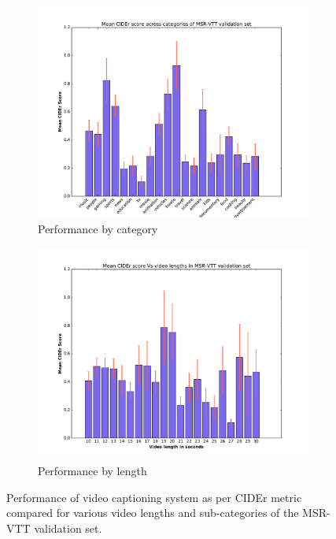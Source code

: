 \begin{figure}[ht]
\begin{center}
  \begin{adjustbox}{center}
  \begin{subfigure}[c]{0.65\linewidth}
    \centering
    \includegraphics[width=1.0\linewidth]{images/VTTCiderCateg.pdf}%
    \caption{Performance by category}%
    \label{fig:VttCategPerf}
  \end{subfigure}%
  \begin{subfigure}[c]{0.65\linewidth}
    \centering
    \includegraphics[width=1.0\linewidth]{images/VTTCiderLengths.pdf}
    \caption{Performance by length}
    \label{fig:VttLenPerf}
  \end{subfigure}
  \end{adjustbox}
\end{center}
\vspace*{-5mm}
\caption{Performance of video captioning system as per CIDEr metric compared for
        various video lengths and sub-categories of the MSR-VTT validation set.}
\label{fig:VttPerf}
\end{figure}

